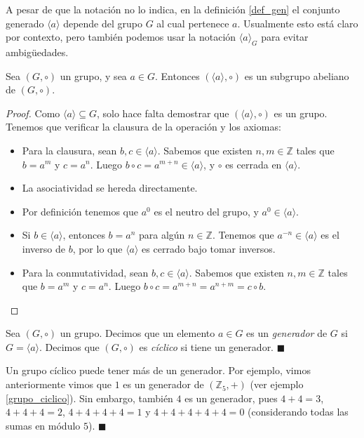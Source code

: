 A pesar de que la notación no lo indica, en la definición \ref{def_gen} el conjunto generado $\langle a \rangle$ depende del grupo $G$ al cual pertenece $a$. Usualmente esto está claro por contexto, pero también podemos usar la notación $\langle a \rangle_{G}$ para evitar ambigüedades.


\begin{proposition}\label{prop-generado}
	Sea $(G,\circ)$ un grupo, y sea $a \in G$. Entonces $(\langle a\rangle , \circ)$ es un subgrupo abeliano de $(G,\circ)$. 
\end{proposition} 


\begin{proof}
Como $\langle a\rangle\subseteq G$, solo hace falta demostrar
que $(\langle a\rangle,\circ)$ es un grupo. Tenemos que verificar la clausura de la operación y los axiomas:
\begin{itemize}
\item Para la clausura, sean $b,c \in \langle
a\rangle$. Sabemos que existen $n, m \in \mathbb{Z}$ tales que $b = a^m$ y $c = a^n$. Luego $b \circ c = a^{m+n} \in \langle a\rangle$, y $\circ$ es cerrada en $\langle a \rangle$.
\item La asociatividad se hereda directamente.
\item Por definición tenemos que $a^0$ es el neutro del grupo, y $a^0 \in \langle a \rangle$. 
\item Si $b \in \langle a \rangle$, entonces $b = a^n$ para algún $n \in \mathbb{Z}$. Tenemos que $a^{-n} \in \langle a \rangle$ es el inverso de $b$, por lo que $\langle a \rangle$ es cerrado bajo tomar inversos.
\item Para la conmutatividad, sean $b,c \in \langle
	a\rangle$. Sabemos que existen $n, m \in \mathbb{Z}$ tales que $b = a^m$ y $c = a^n$. Luego $b \circ c = a^{m + n} = a^{n + m} = c \circ b$.
\end{itemize}
\end{proof}

\begin{definition} 
Sea $(G, \circ)$ un grupo. Decimos que un elemento $a \in G$ es un \emph{generador} de $G$ si $G = \langle a \rangle$. Decimos que $(G, \circ)$ es \emph{cíclico} si tiene un generador.
\hfill$\blacksquare$
\end{definition}

\begin{remark}
Un grupo cíclico puede tener más de un generador. Por ejemplo, vimos anteriormente vimos que $1$ es un generador de $(\mathbb{Z}_5, +)$ (ver ejemplo \ref{grupo_ciclico}). Sin embargo, también $4$ es un generador, pues $4 + 4 = 3$, $4 + 4 + 4 = 2$, $4 + 4 + 4 + 4 = 1$ y $4 + 4 + 4 + 4 + 4 = 0$ (considerando todas las sumas en módulo $5$).
\hfill$\blacksquare$
\end{remark}

